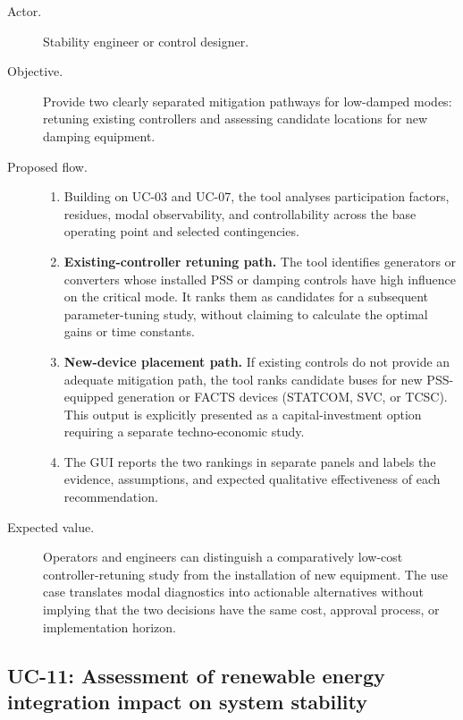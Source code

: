 \begin{description}
  \item[Actor.] Stability engineer or control designer.
  \item[Objective.] Provide two clearly separated mitigation pathways for low-damped modes: retuning existing controllers and assessing candidate locations for new damping equipment.
  \item[Proposed flow.]
        \begin{enumerate}[before=\leavevmode, leftmargin=*]
          \item Building on UC-03 and UC-07, the tool analyses participation factors, residues, modal observability, and controllability across the base operating point and selected contingencies.
          \item \textbf{Existing-controller retuning path.} The tool identifies generators or converters whose installed PSS or damping controls have high influence on the critical mode. It ranks them as candidates for a subsequent parameter-tuning study, without claiming to calculate the optimal gains or time constants.
          \item \textbf{New-device placement path.} If existing controls do not provide an adequate mitigation path, the tool ranks candidate buses for new PSS-equipped generation or FACTS devices (STATCOM, SVC, or TCSC). This output is explicitly presented as a capital-investment option requiring a separate techno-economic study.
          \item The GUI reports the two rankings in separate panels and labels the evidence, assumptions, and expected qualitative effectiveness of each recommendation.
        \end{enumerate}
  \item[Expected value.] Operators and engineers can distinguish a comparatively low-cost controller-retuning study from the installation of new equipment. The use case translates modal diagnostics into actionable alternatives without implying that the two decisions have the same cost, approval process, or implementation horizon.
\end{description}

\subsection{UC-11: Assessment of renewable energy integration impact on system stability}

